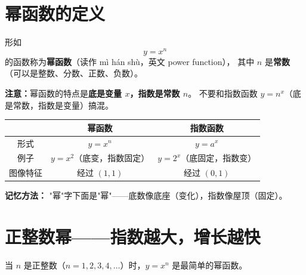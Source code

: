 \section{幂函数的定义}

\begin{definitionbox}[幂函数]
形如
\[
y = x^n
\]
的函数称为\textbf{幂函数}（读作 mì hán shù，英文 power function），
其中 \(n\) 是\textbf{常数}（可以是整数、分数、正数、负数）。

\textbf{注意：}幂函数的特点是\textbf{底是变量 \(x\)，指数是常数 \(n\)}。
不要和指数函数 \(y = n^x\)（底是常数，指数是变量）搞混。
\end{definitionbox}

\begin{examplebox}
\begin{center}
\begin{tabular}{c|c|c}
 & \textbf{幂函数} & \textbf{指数函数} \\
\hline
形式 & \(y = x^n\) & \(y = a^x\) \\
例子 & \(y = x^2\)（底变，指数固定） & \(y = 2^x\)（底固定，指数变） \\
图像特征 & 经过 \((1,1)\) & 经过 \((0,1)\) \\
\end{tabular}
\end{center}

\textbf{记忆方法：} "幂"字下面是"幂"——底数像底座（变化），指数像屋顶（固定）。
\end{examplebox}


\section{正整数幂——指数越大，增长越快}

当 \(n\) 是正整数（\(n = 1, 2, 3, 4, \ldots\)）时，\(y = x^n\) 是最简单的幂函数。

